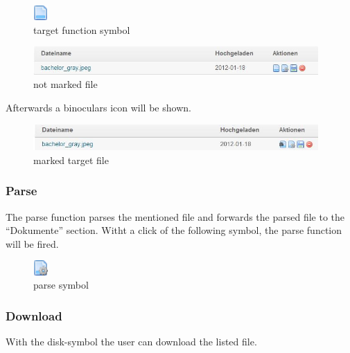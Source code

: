 \begin{figure}[!ht]
  \centering
    \includegraphics[width=0.05\textwidth]{images/page.png}
  \caption{target function symbol}
  \label{fig:einloggen}
\end{figure}

\begin{figure}[!ht]
  \centering
    \includegraphics[width=0.97\textwidth]{images/basic_functionalities/set_target1.jpg}
  \caption{not marked file}
  \label{fig:einloggen}
\end{figure}

Afterwards a binoculars icon will be shown.

\begin{figure}[!ht]
  \centering
    \includegraphics[width=0.97\textwidth]{images/basic_functionalities/set_target3.jpg}
  \caption{marked target file}
  \label{fig:target file}
\end{figure}

\subsubsection{Parse}

The parse function parses the mentioned file and forwards the parsed file to the \enquote{Dokumente} section.
Witht a click of the following symbol, the parse function will be fired.

\begin{figure}[!ht]
  \centering
    \includegraphics[width=0.05\textwidth]{images/page_gear.png}
  \caption{parse symbol}
  \label{fig:parse symbol}
\end{figure}

\subsubsection{Download}

With the disk-symbol the user can download the listed file.

